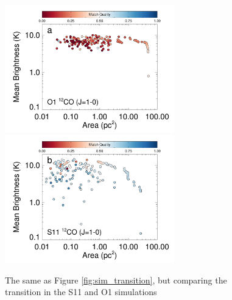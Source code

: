 \begin{figure}[htbp]
\includegraphics[width=2.9in]{figures/stella_dss_co10}
\includegraphics[width=2.9in]{figures/rahul_dss_co10}
\caption{The same as Figure \ref{fig:sim_transition}, but comparing the \coa\, transition in the S11 and O1 simulations}
\label{fig:sim_simulation}
\end{figure}

